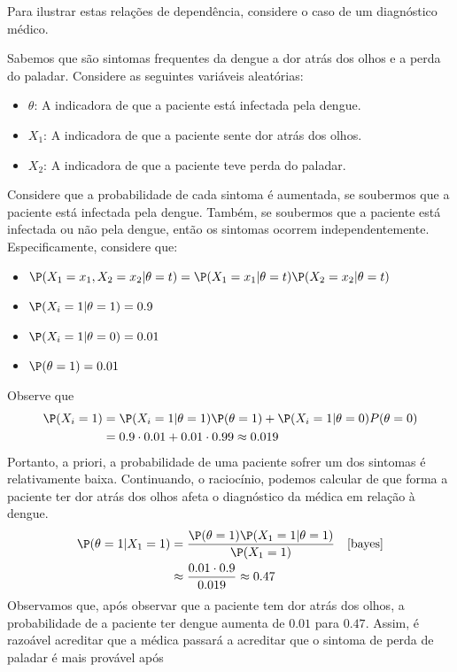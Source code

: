 Para ilustrar estas relações de dependência,
considere o caso de um diagnóstico médico.
\begin{example}
 Sabemos que são sintomas frequentes da dengue
 a dor atrás dos olhos e a perda do paladar.
 Considere as seguintes variáveis aleatórias:
 \begin{itemize}
  \item $\theta$: A indicadora de que 
  a paciente está infectada pela dengue.
  \item $X_{1}$: A indicadora de que
  a paciente sente dor atrás dos olhos.
  \item $X_{2}$: A indicadora de que
  a paciente teve perda do paladar.
 \end{itemize}
 Considere que a probabilidade de 
 cada sintoma é aumentada, se soubermos que 
 a paciente está infectada pela dengue.
 Também, se soubermos que a paciente está 
 infectada ou não pela dengue, então 
 os sintomas ocorrem independentemente.
 Especificamente, considere que:
 \begin{itemize}
  \item $\P(X_{1}=x_{1},X_{2}=x_{2}|\theta=t)
  =\P(X_{1}=x_{1}|\theta=t)\P(X_{2}=x_{2}|\theta=t)$
  \item $\P(X_{i}=1|\theta=1) = 0.9$
  \item $\P(X_{i}=1|\theta=0) = 0.01$
  \item $\P(\theta=1) = 0.01$
 \end{itemize}
 Observe que
 \begin{align*}
  \P(X_{i}=1)
  &=\P(X_{i}=1|\theta=1)\P(\theta=1)
  +\P(X_{i}=1|\theta=0)P(\theta=0) \\
  &= 0.9 \cdot 0.01 + 0.01 \cdot 0.99 \approx 0.019
 \end{align*}
 Portanto, a priori, a probabilidade de uma
 paciente sofrer um dos sintomas é relativamente baixa.
 Continuando, o raciocínio, podemos calcular de que 
 forma a paciente ter dor atrás dos olhos afeta
 o diagnóstico da médica em relação à dengue.
 \begin{align*}
  \P(\theta=1|X_{1}=1)
  &= \frac{\P(\theta=1)\P(X_{1}=1|\theta=1)}
  {\P(X_{1}=1)}
  & \text{\cref{bayes}} \\
  &\approx \frac{0.01 \cdot 0.9}{0.019} 
  \approx 0.47
 \end{align*}
 Observamos que, após observar que 
 a paciente tem dor atrás dos olhos,
 a probabilidade de a paciente ter dengue aumenta 
 de $0.01$ para $0.47$.
 Assim, é razoável acreditar que 
 a médica passará a acreditar que o sintoma
 de perda de paladar é mais provável após 

\end{example}
